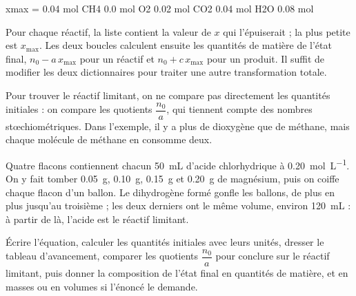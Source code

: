 \begin{console}
xmax = 0.04 mol
CH4 0.0 mol
O2 0.02 mol
CO2 0.04 mol
H2O 0.08 mol
\end{console}
\noindent{} Pour chaque réactif, la liste  contient la valeur de $x$ qui l'épuiserait ; la plus petite
est $x_\mathrm{max}$. Les deux boucles calculent ensuite les quantités de matière de l'état final, $n_0-a\,x_\mathrm{max}$ pour un réactif et
$n_0+c\,x_\mathrm{max}$ pour un produit. Il suffit de modifier les deux dictionnaires pour traiter une autre transformation totale.
\begin{attention}
Pour trouver le réactif limitant, on ne compare pas directement les quantités initiales : on compare les quotients
$\dfrac{n_0}{a}$, qui tiennent compte des nombres stœchiométriques. Dans l'exemple, il y a plus de dioxygène que de méthane, mais
chaque molécule de méthane en consomme deux.
\end{attention}
\begin{experience}
Quatre flacons contiennent chacun \qty{50}{mL} d'acide chlorhydrique à \qty{0,20}{mol.L^{-1}}. On y fait tomber \qty{0,05}{g}, \qty{0,10}{g}, \qty{0,15}{g}
et \qty{0,20}{g} de magnésium, puis on coiffe chaque flacon d'un ballon. Le dihydrogène formé gonfle les ballons, de plus en plus
jusqu'au troisième ; les deux derniers ont le même volume, environ \qty{120}{mL} : à partir de là, l'acide est le réactif limitant.
\end{experience}
\begin{rediger}
Écrire l'équation, calculer les quantités initiales avec leurs unités, dresser le tableau d'avancement, comparer les
quotients $\dfrac{n_0}{a}$ pour conclure sur le réactif limitant, puis donner la composition de l'état final en quantités de
matière, et en masses ou en volumes si l'énoncé le demande.
\end{rediger}
\exercices

